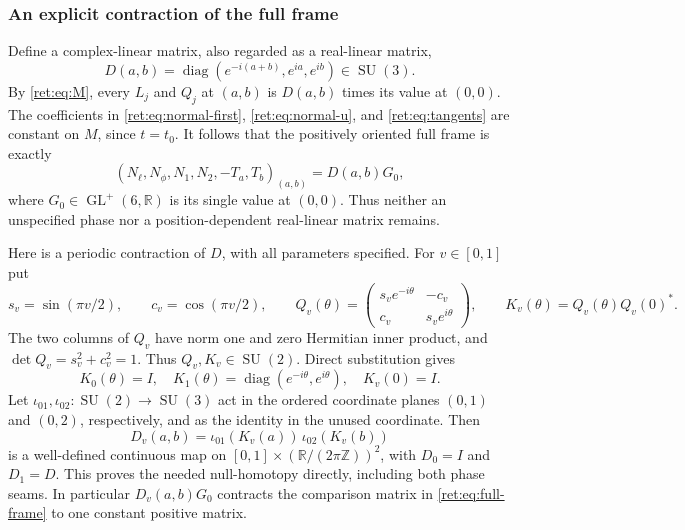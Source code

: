 \documentclass[11pt]{article}
\theoremstyle{definition}
\begin{document}
\subsubsection{An explicit contraction of the full frame}

Define a complex-linear matrix, also regarded as a real-linear matrix,
\begin{equation}
 D(a,b)=\operatorname{diag}(e^{-i(a+b)},e^{ia},e^{ib})\in\operatorname{SU}(3).
 \label{ret:eq:D}
\end{equation}
By \eqref{ret:eq:M}, every \(L_j\) and \(Q_j\) at \((a,b)\) is
\(D(a,b)\) times its value at \((0,0)\).  The coefficients in
\eqref{ret:eq:normal-first}, \eqref{ret:eq:normal-u}, and
\eqref{ret:eq:tangents} are constant on \(M\), since \(t=t_0\).
It follows that the positively oriented full frame is exactly
\begin{equation}
 (N_\ell,N_\phi,N_1,N_2,-T_a,T_b)_{(a,b)}
       =D(a,b)G_0,
 \label{ret:eq:full-frame}
\end{equation}
where \(G_0\in\operatorname{GL}^+(6,\mathbb R)\) is its single value at \((0,0)\).
Thus neither an unspecified phase nor a position-dependent
real-linear matrix remains.

Here is a periodic contraction of \(D\), with all parameters
specified.  For \(v\in[0,1]\) put
\[
 s_v=\sin(\pi v/2),\qquad c_v=\cos(\pi v/2),\qquad
 Q_v(\theta)=
 \begin{pmatrix}s_ve^{-i\theta}&-c_v\\c_v&s_ve^{i\theta}\end{pmatrix},
 \qquad K_v(\theta)=Q_v(\theta)Q_v(0)^*.
\]
The two columns of \(Q_v\) have norm one and zero Hermitian inner
product, and \(\det Q_v=s_v^2+c_v^2=1\).  Thus
\(Q_v,K_v\in\operatorname{SU}(2)\).  Direct substitution gives
\[
 K_0(\theta)=I,\quad
 K_1(\theta)=\operatorname{diag}(e^{-i\theta},e^{i\theta}),\quad
 K_v(0)=I.
\]
Let \(\iota_{01},\iota_{02}:\operatorname{SU}(2)\to\operatorname{SU}(3)\) act in the
ordered coordinate planes \((0,1)\) and \((0,2)\), respectively,
and as the identity in the unused coordinate.  Then
\begin{equation}
 D_v(a,b)=\iota_{01}(K_v(a))\,\iota_{02}(K_v(b))
 \label{ret:eq:D-homotopy}
\end{equation}
is a well-defined continuous map on
\([0,1]\times(\mathbb R/(2\pi\mathbb Z))^2\), with
\(D_0=I\) and \(D_1=D\).  This proves the needed null-homotopy
directly, including both phase seams.  In particular
\(D_v(a,b)G_0\) contracts the comparison matrix in
\eqref{ret:eq:full-frame} to one constant positive matrix.
\end{document}
